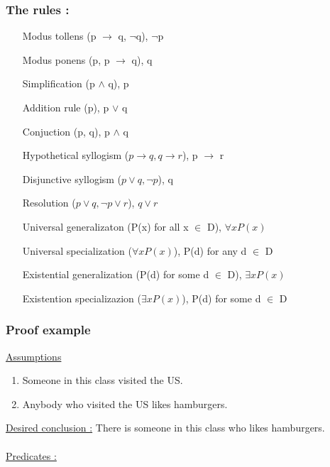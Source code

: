 \documentclass[12pt,a4paper]{article}
\begin{document}
\subsubsection{The rules :}
\begin{itemize}
	\item[Modus tollens] (p $\rightarrow$ q, $\neg$q), $\neg$p
	\item[Modus ponens] (p, p $\rightarrow$ q), q
	\item[Simplification] (p $\wedge$ q), p
	\item[Addition rule] (p), p $\vee$ q
	\item[Conjuction] (p, q), p $\wedge$ q
	\item[Hypothetical syllogism] ($p \rightarrow q, q \rightarrow r$), p $\rightarrow$ r
	\item[Disjunctive syllogism] ($p \vee q, \neg p$), q
	\item[Resolution] ($p \vee q, \neg p \vee r$), $q \vee r$
	\item[Universal generalizaton] (P(x) for all x $\in$ D), $\forall x P(x)$
	\item[Universal specialization] ($\forall x P(x)$), P(d) for any d $\in$ D
	\item[Existential generalization] (P(d) for some d $\in$ D), $\exists x P(x)$
	\item[Existention specializazion] ($\exists x P(x)$), P(d) for some d $\in$ D
\end{itemize}
\subsubsection{Proof example}
\underline{Assumptions}

\begin{enumerate}
	\item Someone in this class visited the US.
	\item Anybody who visited the US likes hamburgers.
\end{enumerate}
\underline{Desired conclusion :} There is someone in this class who likes hamburgers.\\
\\
\underline{Predicates :} 
\end{document}
